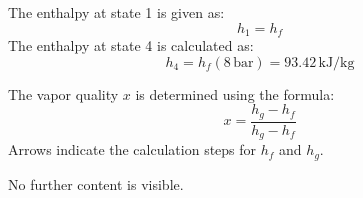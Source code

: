 The enthalpy at state 1 is given as:  
\[
h_1 = h_f
\]  
The enthalpy at state 4 is calculated as:  
\[
h_4 = h_f(8 \, \text{bar}) = 93.42 \, \text{kJ/kg}
\]  

The vapor quality \( x \) is determined using the formula:  
\[
x = \frac{h_g - h_f}{h_g - h_f}
\]  
Arrows indicate the calculation steps for \( h_f \) and \( h_g \).  

No further content is visible.